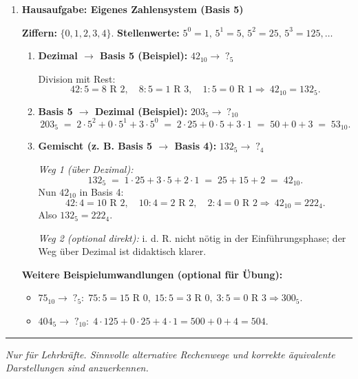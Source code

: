 \documentclass[11pt,a4paper]{scrartcl}
\newenvironment{loesungen}{%
	\begin{enumerate}[leftmargin=*,label=\textbf{Lösung~\arabic*:}]
	}{\end{enumerate}}
\newenvironment{schritte}{%
	\begin{enumerate}[leftmargin=*,label=\alph*)]
	}{\end{enumerate}}
\begin{document}
\begin{loesungen}
		\vspace{0.6em}
		
		\item \textbf{Hausaufgabe: Eigenes Zahlensystem (Basis 5)}
		
		\textbf{Ziffern:} \(\{0,1,2,3,4\}\). \quad
		\textbf{Stellenwerte:} \(5^0=1,\,5^1=5,\,5^2=25,\,5^3=125,\dots\)
		
		\begin{schritte}
			\item \textbf{Dezimal \(\to\) Basis 5 (Beispiel):} \(42_{10}\to \;?_{5}\)
			
			Division mit Rest:
			\[
			42:5=8 \text{ R }2,\quad 8:5=1 \text{ R }3,\quad 1:5=0 \text{ R }1
			\Rightarrow\ 42_{10}=132_5.
			\]
			
			\item \textbf{Basis 5 \(\to\) Dezimal (Beispiel):} \(203_5\to \;?_{10}\)
			\[
			203_5 \;=\; 2\cdot 5^2 + 0\cdot 5^1 + 3\cdot 5^0
			\;=\; 2\cdot 25 + 0\cdot 5 + 3\cdot 1
			\;=\; 50 + 0 + 3 \;=\; 53_{10}.
			\]
			
			\item \textbf{Gemischt (z. B. Basis 5 \(\to\) Basis 4):} \(132_5 \to \;?_{4}\)
			
			\emph{Weg 1 (über Dezimal):}
			\[
			132_5 \;=\; 1\cdot 25 + 3\cdot 5 + 2\cdot 1 \;=\; 25 + 15 + 2 \;=\; 42_{10}.
			\]
			Nun \(42_{10}\) in Basis 4:
			\[
			42:4=10 \text{ R }2,\quad 10:4=2 \text{ R }2,\quad 2:4=0 \text{ R }2
			\Rightarrow\ 42_{10}=222_4.
			\]
			Also \(132_5 = 222_4\).
			
			\emph{Weg 2 (optional direkt):} i. d. R. nicht nötig in der Einführungsphase; der Weg über Dezimal ist didaktisch klarer.
		\end{schritte}
		
		\textbf{Weitere Beispielumwandlungen (optional für Übung):}
		\begin{itemize}[leftmargin=*]
			\item \(75_{10}\to \;?_{5}:\; 75:5=15 \text{ R }0,\; 15:5=3 \text{ R }0,\; 3:5=0 \text{ R }3 \Rightarrow 300_5.\)
			\item \(404_5\to \;?_{10}:\; 4\cdot 125 + 0\cdot 25 + 4\cdot 1 = 500 + 0 + 4 = 504.\)
		\end{itemize}
		
	\end{loesungen}
	
	\vfill
	\hrule
	\small\emph{Nur für Lehrkräfte. Sinnvolle alternative Rechenwege und korrekte äquivalente Darstellungen sind anzuerkennen.}
	
\end{document}
